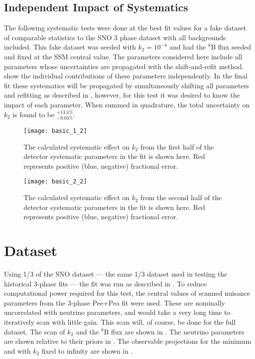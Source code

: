 \clearpage

\subsection{Independent Impact of Systematics}

The following systematic tests were done at the best fit values for a fake dataset of comparable statistics to the SNO 3 phase dataset with all backgrounds included. 
This fake dataset was seeded with $k_2 = 10^{-4}$ and had the $^8$B flux seeded and fixed at the SSM central value.
The parameters considered here include all parameters whose uncertainties are propagated with the shift-and-refit method. 
 show the individual contributions of these parameters independently.
In the final fit these systematics will be propagated by simultaneously shifting all parameters and refitting as described in , however, for this test it was desired to know the impact of each parameter.
When summed in quadrature, the total uncertainty on $k_2$ is found to be $^{+13.4\%}_{-9.03\%}$.

\begin{figure}
\centering
\texttt{[image: basic\_1\_2]}
\caption{The calculated systematic effect on $k_2$ from the first half of the detector systematic parameters in the fit is shown here. Red represents positive (blue, negative) fractional error.}
\label{fig:detector_systematics1}
\end{figure}

\begin{figure}
\centering
\texttt{[image: basic\_2\_2]}
\caption{The calculated systematic effect on $k_2$ from the second half of the detector systematic parameters in the fit is shown here. Red represents positive (blue, negative) fractional error.}
\label{fig:detector_systematics2}
\end{figure}


\clearpage 

\section{ Dataset}
\label{third}

Using 1/3 of the SNO dataset --- the same 1/3 dataset used in testing the historical 3-phase fits --- the fit was run as described in . 
To reduce computational power required for this test, the central values of scanned nuisance parameters from the 3-phase Pee+Pea fit \cite{3phase} were used. 
These are nominally uncorrelated with neutrino parameters, and would take a very long time to iteratively scan with little gain.
This scan will, of course, be done for the full dataset.
The scan of $k_2$ and the $^8$B flux are shown in .
The neutrino parameters are shown relative to their priors in .
The observable projections for the minimum and with $k_2$ fixed to infinity are shown in .


